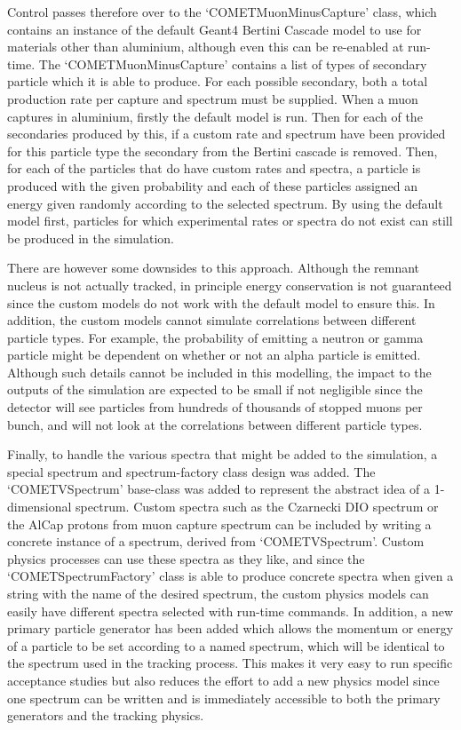 Control passes therefore over to the `COMETMuonMinusCapture' class, which contains an instance of the default Geant4 Bertini Cascade model to use for materials other than aluminium, although even this can be re-enabled at run-time.
The `COMETMuonMinusCapture' contains a list of types of secondary particle which it is able to produce.  
For each possible secondary, both a total production rate per capture and spectrum must be supplied.
When a muon captures in aluminium, firstly the default model is run.
Then for each of the secondaries produced by this, if a custom rate and spectrum have been provided for this particle type the secondary from the Bertini cascade is removed.
Then, for each of the particles that do have custom rates and spectra, a particle is produced with the given probability and each of these particles assigned an energy given randomly according to the selected spectrum.
By using the default model first, particles for which experimental rates or spectra do not exist can still be produced in the simulation.

There are however some downsides to this approach.
Although the remnant nucleus is not actually tracked, in principle energy conservation is not guaranteed since the custom models do not work with the default model to ensure this.
In addition, the custom models cannot simulate correlations between different particle types. 
For example, the probability of emitting a neutron or gamma particle might be dependent on whether or not an alpha particle is emitted. 
Although such details cannot be included in this modelling, the impact to the outputs of the simulation are expected to be small if not negligible since the detector will see particles from hundreds of thousands of stopped muons per bunch, and will not look at the correlations between different particle types.

Finally, to handle the various spectra that might be added to the simulation, a special spectrum and spectrum-factory class design was added.
The `COMETVSpectrum' base-class was added to represent the abstract idea of a 1-dimensional spectrum.
Custom spectra such as the Czarnecki \ac{DIO} spectrum or the AlCap protons from muon capture spectrum can be included by writing a concrete instance of a spectrum, derived from `COMETVSpectrum'.
Custom physics processes can use these spectra as they like, and since the `COMETSpectrumFactory' class is able to produce concrete spectra when given a string with the name of the desired spectrum, the custom physics models can easily have different spectra selected with run-time commands.
In addition, a new primary particle generator has been added which allows the momentum or energy of a particle to be set according to a named spectrum, which will be identical to the spectrum used in the tracking process.
This makes it very easy to run specific acceptance studies but also reduces the effort to add a new physics model since one spectrum can be written and is immediately accessible to both the primary generators and the tracking physics.

